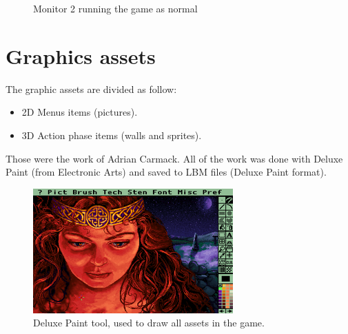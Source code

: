\documentclass[book.tex]{subfiles}
\begin{document}
\begin{figure}[H]
\centering
\caption{Monitor 2 running the game as normal}
\label{fig:dm1}
\end{figure}



 
 
 




\section{Graphics assets}
The graphic assets are divided as follow:
\begin{itemize}
\item 2D Menus items (pictures).
\item 3D Action phase items (walls and sprites).
\end{itemize}
Those were the work of Adrian Carmack. All of the work was done with Deluxe Paint (from Electronic Arts) and saved to LBM files (Deluxe Paint format). 

\begin{figure}[H]
  \centering
 \includegraphics[width=\textwidth]{imgs/deluxe_paint.png}
 \caption{Deluxe Paint tool, used to draw all assets in the game.}
\end{figure}
\end{document}
